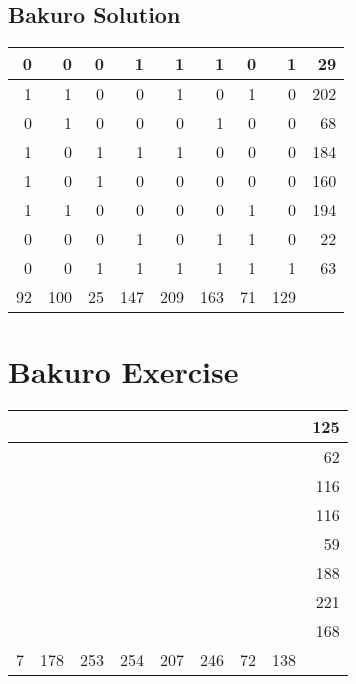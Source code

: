 \documentclass[]{article}
\begin{document}
 \subsection{Bakuro Solution} 
\begin{tabular}{rrrrrrrrr}
\hline
  0 &   0 &  0 &   1 &   1 &   1 &  0 &   1 &  29 \\ \hline
  1 &   1 &  0 &   0 &   1 &   0 &  1 &   0 & 202 \\ \hline
  0 &   1 &  0 &   0 &   0 &   1 &  0 &   0 &  68 \\ \hline
  1 &   0 &  1 &   1 &   1 &   0 &  0 &   0 & 184 \\ \hline
  1 &   0 &  1 &   0 &   0 &   0 &  0 &   0 & 160 \\ \hline
  1 &   1 &  0 &   0 &   0 &   0 &  1 &   0 & 194 \\ \hline
  0 &   0 &  0 &   1 &   0 &   1 &  1 &   0 &  22 \\ \hline
  0 &   0 &  1 &   1 &   1 &   1 &  1 &   1 &  63 \\ \hline
 92 & 100 & 25 & 147 & 209 & 163 & 71 & 129 &     \\ \hline
\hline
\end{tabular}\newpage\section{Bakuro Exercise}\begin{tabular}{rrrrrrrrr}
\hline
   &     &     &     &     &     &    &     & 125 \\ \hline
   &     &     &     &     &     &    &     &  62 \\ \hline
   &     &     &     &     &     &    &     & 116 \\ \hline
   &     &     &     &     &     &    &     & 116 \\ \hline
   &     &     &     &     &     &    &     &  59 \\ \hline
   &     &     &     &     &     &    &     & 188 \\ \hline
   &     &     &     &     &     &    &     & 221 \\ \hline
   &     &     &     &     &     &    &     & 168 \\ \hline
 7 & 178 & 253 & 254 & 207 & 246 & 72 & 138 &     \\ \hline
\hline
\end{tabular}\newpage 
\end{document}
